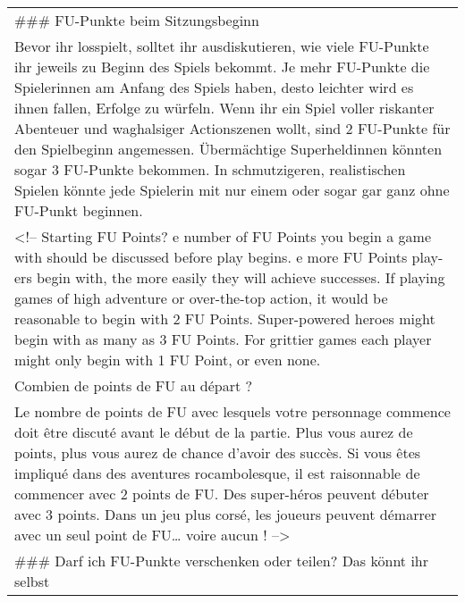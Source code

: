 \documentclass[]{article}
\begin{document}
\begin{longtable}[]{@{}l@{}}
\toprule
\begin{minipage}[t]{0.05\columnwidth}\raggedright\strut
\#\#\# FU-Punkte beim Sitzungsbeginn
\strut\end{minipage}\tabularnewline
\begin{minipage}[t]{0.05\columnwidth}\raggedright\strut
Bevor ihr losspielt, solltet ihr ausdiskutieren, wie viele FU-Punkte ihr
jeweils zu Beginn des Spiels bekommt. Je mehr FU-Punkte die Spielerinnen
am Anfang des Spiels haben, desto leichter wird es ihnen fallen, Erfolge
zu würfeln. Wenn ihr ein Spiel voller riskanter Abenteuer und
waghalsiger Actionszenen wollt, sind 2 FU-Punkte für den Spielbeginn
angemessen. Übermächtige Superheldinnen könnten sogar 3 FU-Punkte
bekommen. In schmutzigeren, realistischen Spielen könnte jede Spielerin
mit nur einem oder sogar gar ganz ohne FU-Punkt beginnen.
\strut\end{minipage}\tabularnewline
\begin{minipage}[t]{0.05\columnwidth}\raggedright\strut
\textless{}!-- Starting FU Points? e number of FU Points you begin a
game with should be discussed before play begins. e more FU Points play-
ers begin with, the more easily they will achieve successes. If playing
games of high adventure or over-the-top action, it would be reasonable
to begin with 2 FU Points. Super-powered heroes might begin with as many
as 3 FU Points. For grittier games each player might only begin with 1
FU Point, or even none.
\strut\end{minipage}\tabularnewline
\begin{minipage}[t]{0.05\columnwidth}\raggedright\strut
Combien de points de FU au départ ?
\strut\end{minipage}\tabularnewline
\begin{minipage}[t]{0.05\columnwidth}\raggedright\strut
Le nombre de points de FU avec lesquels votre personnage commence doit
être discuté avant le début de la partie. Plus vous aurez de points,
plus vous aurez de chance d'avoir des succès. Si vous êtes impliqué dans
des aventures rocambolesque, il est raisonnable de commencer avec 2
points de FU. Des super-héros peuvent débuter avec 3 points. Dans un jeu
plus corsé, les joueurs peuvent démarrer avec un seul point de
FU\ldots{} voire aucun ! --\textgreater{}
\strut\end{minipage}\tabularnewline
\begin{minipage}[t]{0.05\columnwidth}\raggedright\strut
\#\#\# Darf ich FU-Punkte verschenken oder teilen? Das könnt ihr selbst

\end{minipage}
\end{longtable}
\end{document}
